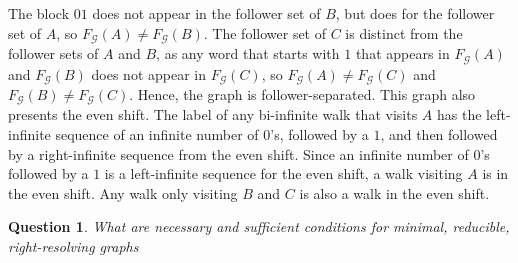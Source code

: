 \documentclass{article}
\newcommand{\Gc}{\mathcal{G}}  %
\newtheorem*{question}{Question}
\begin{document}
The block \(01\) does not appear in the follower set of \(B\), but does for the follower 
set of \(A\), so \(F_\Gc(A) \ne F_\Gc(B)\). The follower set of \(C\) is distinct from
the follower sets of \(A\) and \(B\), as any word that starts with \(1\) that appears in 
\(F_\Gc(A)\) and \(F_\Gc(B)\) does not appear in \(F_\Gc(C)\), so \(F_\Gc(A) \ne F_\Gc(C)\) and 
\(F_\Gc(B) \ne F_\Gc(C)\). Hence, the graph is follower-separated. This graph also presents 
the even shift. The label of any bi-infinite walk that visits \(A\) has the left-infinite 
sequence of an infinite number of \(0\)'s, followed by a \(1\), and then followed by a 
right-infinite sequence from the even shift. Since an infinite number of \(0\)'s followed by 
a \(1\) is a left-infinite sequence for the even shift, a walk visiting \(A\) is in the 
even shift. Any walk only visiting \(B\) and \(C\) is also a walk in the even shift. 

\begin{question}
    What are necessary and sufficient conditions for minimal, reducible, right-resolving graphs 
    
\end{question}

\printbibliography
\end{document}
